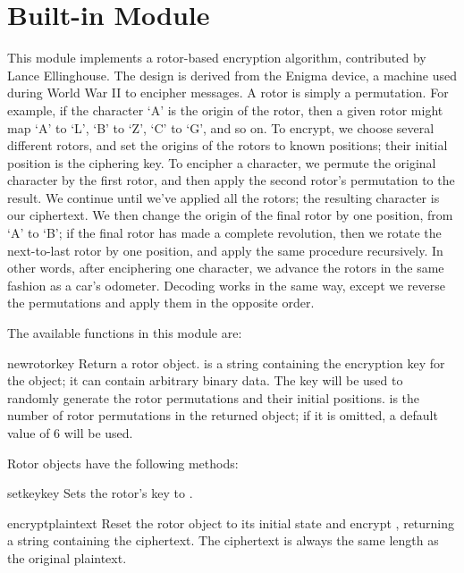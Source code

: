 \section{Built-in Module }

This module implements a rotor-based encryption algorithm, contributed by
Lance Ellinghouse.  The design is derived from the Enigma device, a machine
used during World War II to encipher messages.  A rotor is simply a
permutation.  For example, if the character `A' is the origin of the rotor,
then a given rotor might map `A' to `L', `B' to `Z', `C' to `G', and so on.
To encrypt, we choose several different rotors, and set the origins of the
rotors to known positions; their initial position is the ciphering key.  To
encipher a character, we permute the original character by the first rotor,
and then apply the second rotor's permutation to the result. We continue
until we've applied all the rotors; the resulting character is our
ciphertext.  We then change the origin of the final rotor by one position,
from `A' to `B'; if the final rotor has made a complete revolution, then we
rotate the next-to-last rotor by one position, and apply the same procedure
recursively.  In other words, after enciphering one character, we advance
the rotors in the same fashion as a car's odometer. Decoding works in the
same way, except we reverse the permutations and apply them in the opposite
order.

The available functions in this module are:

\renewcommand{\indexsubitem}{(in module rotor)}
\begin{funcdesc}{newrotor}{key}
Return a rotor object.  is a string containing the encryption key
for the object; it can contain arbitrary binary data. The key will be used
to randomly generate the rotor permutations and their initial positions.
 is the number of rotor permutations in the returned object;
if it is omitted, a default value of 6 will be used.
\end{funcdesc}

Rotor objects have the following methods:

\renewcommand{\indexsubitem}{(rotor method)}
\begin{funcdesc}{setkey}{key}
Sets the rotor's key to .
\end{funcdesc}

\begin{funcdesc}{encrypt}{plaintext}
Reset the rotor object to its initial state and encrypt ,
returning a string containing the ciphertext.  The ciphertext is always the
same length as the original plaintext.
\end{funcdesc}

